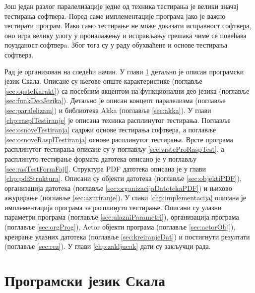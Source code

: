 \documentclass[12pt,oneside]{memoir}
\begin{document}
Још један разлог паралелизације једне од техника тестирања је велики значај тестирања софтвера. Поред саме имплементације програма јако је важно тестирати програм. Иако само тестирање не може доказати исправност софтвера, оно игра велику улогу у проналажењу и исправљању грешака чиме се повећава поузданост софтверa. Због тога су у раду обухваћене и основе тестирања софтвера.

Рад је организован на следећи начин. У глави \ref{chp:skala} детаљно је описан програмски језик Скала. Описане су његове опште карактеристике (поглавље \ref{sec:opsteKarakt}) са посебним акцентом на функционални део језика (поглавље \ref{sec:funkDeoJezika}). Детаљно је описан концепт паралелизма (поглавље \ref{sec:paralelizam}) и библиотека Akka (поглавље \ref{sec:akka}). У глави \ref{chp:rasplTestiranje} је описана техника расплинутог тестирања. Поглавље \ref{sec:osnoveTestiranja} садржи основе тестирања софтвера, а поглавље \ref{sec:osnoveRasplTestiranja} основе расплинутог тестирања. Врсте програма расплинутог тестирања описане су у поглављу \ref{sec:vrsteProRaspTest}, а расплинуто тестирање формата датотека описано је у поглављу \ref{sec:rasTestFormFajl}. Структура PDF датотека описана је у глави \ref{chp:pdfStruktura}. Описани су објекти датотека (поглавље \ref{sec:objektiPDF}), организација датотека (поглавље \ref{sec:organizacijaDatotekaPDF}) и њихово ажурирање (поглавље \ref{sec:azuriranje}). У глави \ref{chp:implementacija} описана је имплементација програма за расплинуто тестирање. Описани су улазни параметри програма (поглавље \ref{sec:ulazniParametri}), организација програма (поглавље \ref{sec:orgProg}), Actor објекти програма (поглавље \ref{sec:actorObj}), креирање улазних датотека (поглавље \ref{sec:kreiranjeDat}) и постигнути резултати (поглавље \ref{sec:rez}). У глави \ref{chp:zakljucak} дати су закључци рада. 


\chapter{Програмски језик Скала}
\label{chp:skala}
\end{document}
